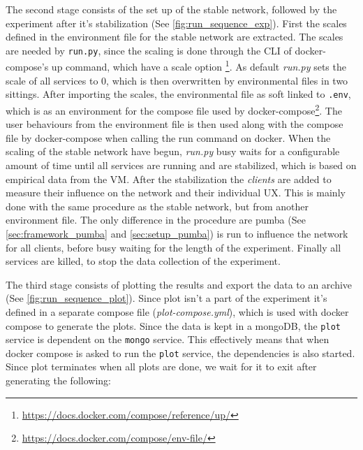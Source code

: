 

The second stage consists of the set up of the stable network, followed by the experiment after it's stabilization (See \autoref{fig:run_sequence_exp}). First the scales defined in the environment file for the stable network are extracted. The scales are needed by \texttt{run.py}, since the scaling is done through the \ac{CLI} of docker-compose's up command, which have a scale option \footnote{\url{https://docs.docker.com/compose/reference/up/}}. As default \textit{run.py} sets the scale of all services to 0, which is then overwritten by environmental files in two sittings.
After importing the scales, the environmental file as soft linked to \texttt{.env}, which is as an environment for the compose file used by docker-compose\footnote{\url{https://docs.docker.com/compose/env-file/}}.
The user behaviours from the environment file is then used along with the compose file by docker-compose when calling the run command on docker.
When the scaling of the stable network have begun, \textit{run.py} busy waits for a configurable amount of time until all services are running and are stabilized, which is based on empirical data from the \acs{VM}.
After the stabilization the \textit{clients} are added to measure their influence on the network and their individual \acs{UX}. This is mainly done with the same procedure as the stable network, but from another environment file. The only difference in the procedure are pumba (See \autoref{sec:framework_pumba}
 and \ref{sec:setup_pumba}) is run to influence the network for all clients, before busy waiting for the length of the experiment.
Finally all services are killed, to stop the data collection of the experiment.



The third stage consists of plotting the results and export the data to an archive (See \autoref{fig:run_sequence_plot}). Since plot isn't a part of the experiment it's defined in a separate compose file (\textit{plot-compose.yml}), which is used with docker compose to generate the plots. Since the data is kept in a mongoDB, the \texttt{plot} service is dependent on the \texttt{mongo} service. This effectively means that when docker compose is asked to run the \texttt{plot} service, the dependencies is also started. Since plot terminates when all plots are done, we wait for it to exit after generating the following:

